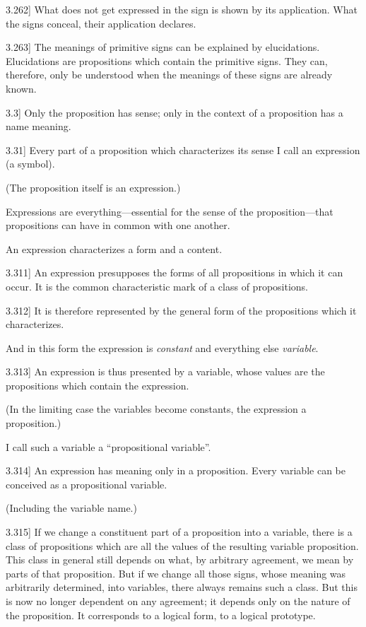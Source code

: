 \documentclass[12pt,oneside]{book}[2007/10/19]
\newcommand{\PropositionE}[2]{%
  \item[\phantomsection\label{PropE:#1}\PropGRef{#1}] #2%
}
\newcommand{\PropGRef}[1]{\hyperref[PropG:#1]{#1}}
\begin{document}
\begin{propositions}
\PropositionE{3.262}
{What does not get expressed in the sign is
shown by its application. What the signs conceal,
their application declares.}


\PropositionE{3.263}
{The meanings of primitive signs can be
explained by elucidations. Elucidations are propositions
which contain the primitive signs. They
can, therefore, only be understood when the
meanings of these signs are already known.}


\PropositionE{3.3}
{Only the proposition has sense; only in the
context of a proposition has a name meaning.}


\PropositionE{3.31}
{Every part of a proposition which characterizes
its sense I call an expression (a symbol).

(The proposition itself is an expression.)

Expressions are everything---essential for the
sense of the prop\-o\-si\-tion---that propositions can
have in common with one another.

An expression characterizes a form and a
content.}


\PropositionE{3.311}
{An expression presupposes the forms of all
propositions in which it can occur. It is the
common characteristic mark of a class of propositions.}


\PropositionE{3.312}
{It is therefore represented by the general form
of the propositions which it characterizes.

And in this form the expression is \emph{constant} and
everything else \emph{variable}.}


\PropositionE{3.313}
{An expression is thus presented by a variable,
whose values are the propositions which contain
the expression.

(In the limiting case the variables become
constants, the expression a proposition.)

I call such a variable a ``propositional variable''.}


\PropositionE{3.314}
{An expression has meaning only in a proposition.
Every variable can be conceived as a
propositional variable.

(Including the variable name.)}


\PropositionE{3.315}
{If we change a constituent part of a proposition
into a variable, there is a class of propositions
which are all the values of the resulting variable
proposition. This class in general still depends
on what, by arbitrary agreement, we mean by
parts of that proposition. But if we change all
those signs, whose meaning was arbitrarily determined,
into variables, there always remains such
a class. But this is now no longer dependent on
any agreement; it depends only on the nature of
the proposition. It corresponds to a logical form,
to a logical prototype.}



\end{propositions}
\end{document}
